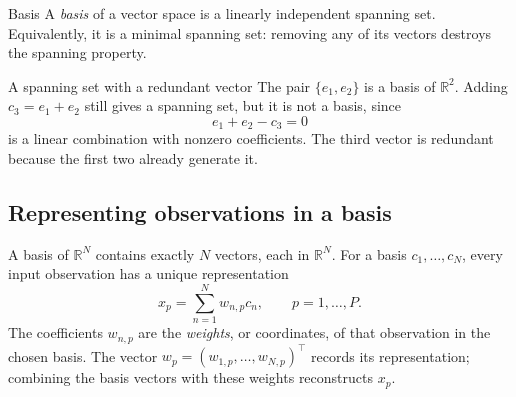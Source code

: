 \documentclass[a4paper,12pt,oneside]{report}
\begin{document}
\begin{frameddefn}{Basis}\label{def:basis}
A \emph{basis} of a vector space is a linearly independent spanning
set. Equivalently, it is a minimal spanning set: removing any of its
vectors destroys the spanning property.
\end{frameddefn}

\begin{framedexample}{A spanning set with a redundant vector}
The pair $\{e_1,e_2\}$ is a basis of $\mathbb{R}^{2}$. Adding
$c_3=e_1+e_2$ still gives a spanning set, but it is not a basis, since
\[
  e_1+e_2-c_3=0
\]
is a linear combination with nonzero coefficients. The third vector
is redundant because the first two already generate it.
\end{framedexample}

\subsection{Representing observations in a basis}

A basis of $\mathbb{R}^{N}$ contains exactly $N$ vectors, each in
$\mathbb{R}^{N}$. For a basis $c_1,\ldots,c_N$, every input observation
has a unique representation
\[
  x_p=\sum_{n=1}^{N}w_{n,p}c_n,
  \qquad p=1,\ldots,P.
\]
The coefficients $w_{n,p}$ are the \emph{weights}, or coordinates,
of that observation in the chosen basis. The vector
$w_p=(w_{1,p},\ldots,w_{N,p})^\top$ records its representation;
combining the basis vectors with these weights reconstructs $x_p$.
\end{document}

